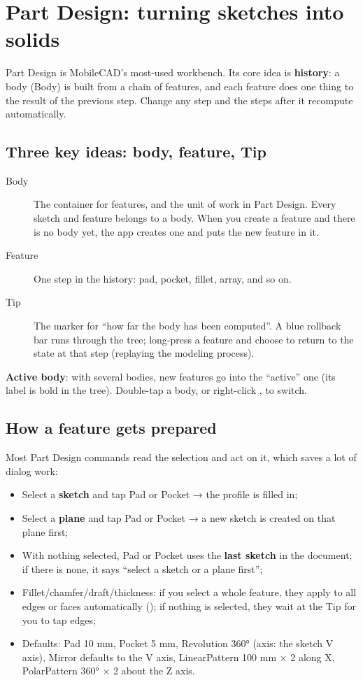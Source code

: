 \chapter{Part Design: turning sketches into solids}

Part Design is MobileCAD's most-used workbench. Its core idea is \textbf{history}: a body (Body) is built from a chain of
features, and each feature does one thing to the result of the previous step. Change any step and the steps after it
recompute automatically.

\section{Three key ideas: body, feature, Tip}

\begin{description}
  \item[Body] The container for features, and the unit of work in Part Design. Every sketch and feature belongs to a body.
        When you create a feature and there is no body yet, the app creates one and puts the new feature in it.
  \item[Feature] One step in the history: pad, pocket, fillet, array, and so on.
  \item[Tip] The marker for ``how far the body has been computed''. A blue rollback bar runs through the tree; long-press
        a feature and choose  to return to the state at that step (replaying the modeling process).
\end{description}

\textbf{Active body}: with several bodies, new features go into the ``active'' one (its label is bold in the
tree). Double-tap a body, or right-click , to switch.

\section{How a feature gets prepared}

Most Part Design commands read the selection and act on it, which saves a lot of dialog work:

\begin{itemize}
  \item Select a \textbf{sketch} and tap Pad or Pocket → the profile is filled in;
  \item Select a \textbf{plane} and tap Pad or Pocket → a new sketch is created on that plane first;
  \item With nothing selected, Pad or Pocket uses the \textbf{last sketch} in the document; if there is none, it says
        ``select a sketch or a plane first'';
  \item Fillet/chamfer/draft/thickness: if you select a whole feature, they apply to all edges or faces automatically
        (); if nothing is selected, they wait at the Tip for you to tap edges;
  \item Defaults: Pad 10 mm, Pocket 5 mm, Revolution 360° (axis: the sketch V axis), Mirror defaults to the V axis, LinearPattern
        100 mm × 2 along X, PolarPattern 360° × 2 about the Z axis.
\end{itemize}


